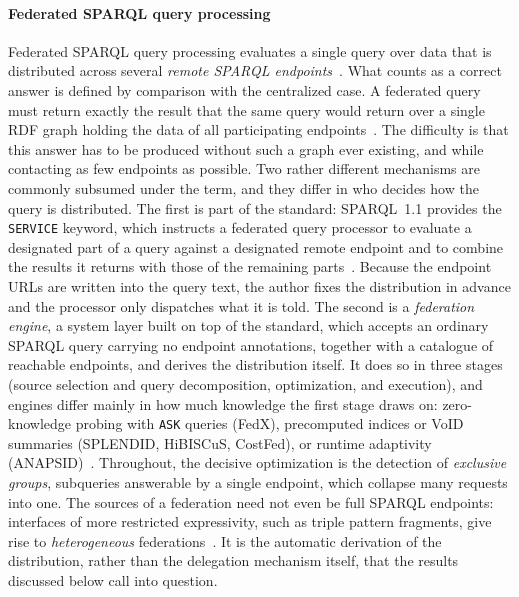 \documentclass[
]{ceurart}
\begin{document}
\paragraph{Federated SPARQL query processing}
Federated SPARQL query processing evaluates a single query over data that is distributed across several \emph{remote SPARQL endpoints}~\cite{prudhommeaux2013federated}.
What counts as a correct answer is defined by comparison with the centralized case.
A federated query must return exactly the result that the same query would return over a single RDF graph holding the data of all participating endpoints~\cite{aimonier-davat_fedup_2024,heling_federated_2022}.
The difficulty is that this answer has to be produced without such a graph ever existing, and while contacting as few endpoints as possible.
Two rather different mechanisms are commonly subsumed under the term, and they differ in who decides how the query is distributed.
 The first is part of the standard: SPARQL~1.1 provides the \texttt{SERVICE} keyword, which instructs a federated query processor to evaluate a designated part of a query against a designated remote endpoint and to combine the results it returns with those of the remaining parts~\cite{prudhommeaux2013federated}.
 Because the endpoint URLs are written into the query text, the author fixes the distribution in advance and the processor only dispatches what it is told.
 The second is a \emph{federation engine}, a system layer built on top of the standard, which accepts an ordinary SPARQL query carrying no endpoint annotations, together with a catalogue of reachable endpoints, and derives the distribution itself.
 It does so in three stages (source selection and query decomposition, optimization, and execution), and engines differ mainly in how much knowledge the first stage draws on: zero-knowledge probing with \texttt{ASK} queries (FedX), precomputed indices or VoID summaries (SPLENDID, HiBISCuS, CostFed), or runtime adaptivity (ANAPSID)~\cite{heling_federated_2022,vidal_selection_2016,saleem_largerdfbench_2018}.
 Throughout, the decisive optimization is the detection of \emph{exclusive groups}, subqueries answerable by a single endpoint, which collapse many requests into one.
 The sources of a federation need not even be full SPARQL endpoints: interfaces of more restricted expressivity, such as triple pattern fragments, give rise to \emph{heterogeneous} federations~\cite{heling_federated_2022}.
 It is the automatic derivation of the distribution, rather than the delegation mechanism itself, that the results discussed below call into question.
\end{document}
